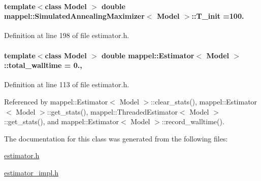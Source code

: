 \paragraph[{\texorpdfstring{T\+\_\+init}{T_init}}]{\setlength{\rightskip}{0pt plus 5cm}template$<$class Model $>$ double {\bf mappel\+::\+Simulated\+Annealing\+Maximizer}$<$ Model $>$\+::T\+\_\+init =100.}\hypertarget{classmappel_1_1SimulatedAnnealingMaximizer_a5a697acb3663ef6aad85157cce00080e}{}\label{classmappel_1_1SimulatedAnnealingMaximizer_a5a697acb3663ef6aad85157cce00080e}


Definition at line 198 of file estimator.\+h.

\paragraph[{\texorpdfstring{total\+\_\+walltime}{total_walltime}}]{\setlength{\rightskip}{0pt plus 5cm}template$<$class Model $>$ double {\bf mappel\+::\+Estimator}$<$ Model $>$\+::total\+\_\+walltime = 0.\hspace{0.3cm}{\ttfamily [protected]}, {\ttfamily [inherited]}}\hypertarget{classmappel_1_1Estimator_a5a408458a111c5222193871fa6bb6644}{}\label{classmappel_1_1Estimator_a5a408458a111c5222193871fa6bb6644}


Definition at line 113 of file estimator.\+h.



Referenced by mappel\+::\+Estimator$<$ Model $>$\+::clear\+\_\+stats(), mappel\+::\+Estimator$<$ Model $>$\+::get\+\_\+stats(), mappel\+::\+Threaded\+Estimator$<$ Model $>$\+::get\+\_\+stats(), and mappel\+::\+Estimator$<$ Model $>$\+::record\+\_\+walltime().



The documentation for this class was generated from the following files\+:\begin{DoxyCompactItemize}
\item 
\hyperlink{estimator_8h}{estimator.\+h}\item 
\hyperlink{estimator__impl_8h}{estimator\+\_\+impl.\+h}\end{DoxyCompactItemize}
